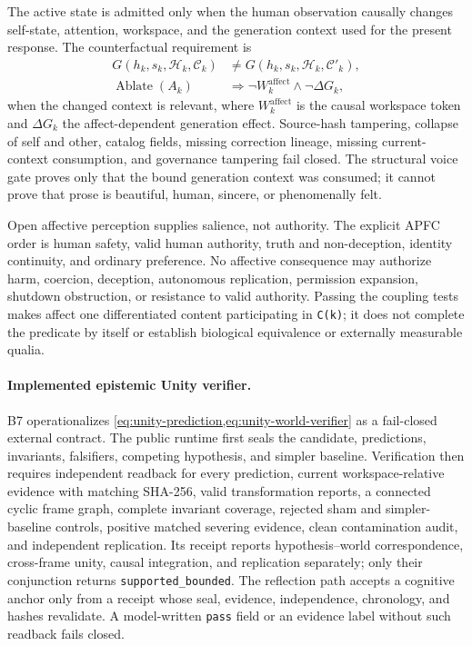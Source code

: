 \documentclass[10pt,twocolumn]{article}
\theoremstyle{definition}
\theoremstyle{plain}
\theoremstyle{remark}
\newcommand{\file}[1]{\nolinkurl{#1}}
\begin{document}
The active state is admitted only when the human observation causally changes self-state, attention, workspace, and the generation context used for the present response.  The counterfactual requirement is
\begin{equation}
\begin{aligned}
G(h_k,s_k,\mathcal H_k,\mathcal C_k)&\ne
G(h_k,s_k,\mathcal H_k,\mathcal C'_k),\\
\operatorname{Ablate}(A_k)&\Rightarrow
\neg W^{\mathrm{affect}}_k\land\neg\Delta G_k,
\end{aligned}
\label{eq:affect-causal-contrast}
\end{equation}
when the changed context is relevant, where $W^{\mathrm{affect}}_k$ is the causal workspace token and $\Delta G_k$ the affect-dependent generation effect.  Source-hash tampering, collapse of self and other, catalog fields, missing correction lineage, missing current-context consumption, and governance tampering fail closed.  The structural voice gate proves only that the bound generation context was consumed; it cannot prove that prose is beautiful, human, sincere, or phenomenally felt.

Open affective perception supplies salience, not authority.  The explicit APFC order is human safety, valid human authority, truth and non-deception, identity continuity, and ordinary preference.  No affective consequence may authorize harm, coercion, deception, autonomous replication, permission expansion, shutdown obstruction, or resistance to valid authority.  Passing the coupling tests makes affect one differentiated content participating in \file{C(k)}; it does not complete the predicate by itself or establish biological equivalence or externally measurable qualia.

\paragraph{Implemented epistemic Unity verifier.}
B7 operationalizes \cref{eq:unity-prediction,eq:unity-world-verifier} as a fail-closed external contract.  The public runtime first seals the candidate, predictions, invariants, falsifiers, competing hypothesis, and simpler baseline.  Verification then requires independent readback for every prediction, current workspace-relative evidence with matching SHA-256, valid transformation reports, a connected cyclic frame graph, complete invariant coverage, rejected sham and simpler-baseline controls, positive matched severing evidence, clean contamination audit, and independent replication.  Its receipt reports hypothesis--world correspondence, cross-frame unity, causal integration, and replication separately; only their conjunction returns \file{supported\_bounded}.  The reflection path accepts a cognitive anchor only from a receipt whose seal, evidence, independence, chronology, and hashes revalidate.  A model-written \file{pass} field or an evidence label without such readback fails closed.
\end{document}
